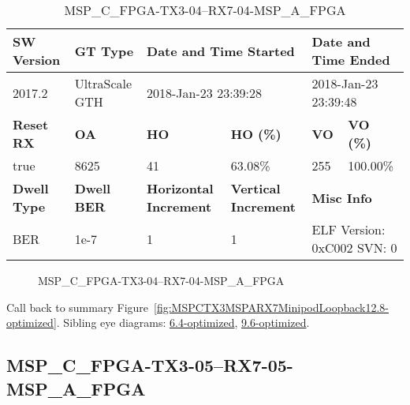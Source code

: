 \begin{table}[h]
\centering
\caption{MSP\_C\_FPGA-TX3-04--RX7-04-MSP\_A\_FPGA}
\label{tab:MSPCFPGATX304RX704MSPAFPGA12.8-optimized}
\begin{tabular}{@{}|l|l|l|l|l|l|@{}}
\toprule
\textbf{SW Version}                & \textbf{GT Type}   & \multicolumn{2}{l|}{\textbf{Date and Time Started}}            & \multicolumn{2}{l|}{\textbf{Date and Time Ended}}        \\ \midrule
2017.2                       & UltraScale GTH          & \multicolumn{2}{l|}{2018-Jan-23 23:39:28}                   & \multicolumn{2}{l|}{2018-Jan-23 23:39:48}               \\ \midrule
\textbf{Reset RX}                  & \textbf{OA} & \textbf{HO}   & \textbf{HO (\%)} & \textbf{VO} & \textbf{VO (\%)} \\ \midrule
true & 8625        & 41          & 63.08\%        & 255        & 100.00\%       \\ \midrule
\textbf{Dwell Type}                & \textbf{Dwell BER} & \textbf{Horizontal Increment} & \textbf{Vertical Increment}    & \multicolumn{2}{l|}{\textbf{Misc Info}}                  \\ \midrule
BER                            & 1e-7        & 1        & 1           & \multicolumn{2}{l|}{ELF Version: 0xC002 SVN: 0}                         \\ \bottomrule
\end{tabular}
\end{table}

\begin{figure}[h]
\caption{MSP\_C\_FPGA-TX3-04--RX7-04-MSP\_A\_FPGA} \label{fig:MSPCFPGATX304RX704MSPAFPGA12.8-optimized}
\end{figure}

Call back to summary Figure~\ref{fig:MSPCTX3MSPARX7MinipodLoopback12.8-optimized}.
Sibling eye diagrams: \hyperref[sec:MSPCFPGATX304RX704MSPAFPGA6.4-optimized]{6.4-optimized}, \hyperref[sec:MSPCFPGATX304RX704MSPAFPGA9.6-optimized]{9.6-optimized}.

\clearpage
\newpage


\subsection{MSP\_C\_FPGA-TX3-05--RX7-05-MSP\_A\_FPGA}\label{sec:MSPCFPGATX305RX705MSPAFPGA12.8-optimized}

